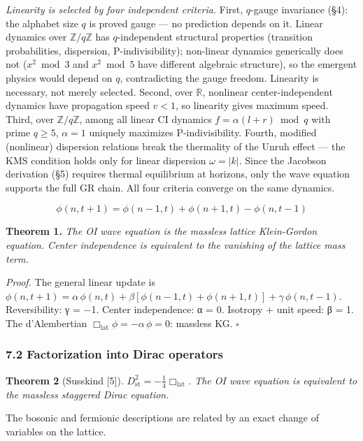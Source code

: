 \documentclass[
  11pt,
]{article}
\begin{document}
\emph{Linearity is selected by four independent criteria.} First,
\(q\)-gauge invariance (§4): the alphabet size \(q\) is proved gauge ---
no prediction depends on it. Linear dynamics over
\(\mathbb{Z}/q\mathbb{Z}\) has \(q\)-independent structural properties
(transition probabilities, dispersion, P-indivisibility); non-linear
dynamics generically does not (\(x^2 \bmod 3\) and \(x^2 \bmod 5\) have
different algebraic structure), so the emergent physics would depend on
\(q\), contradicting the gauge freedom. Linearity is necessary, not
merely selected. Second, over \(\mathbb{R}\), nonlinear
center-independent dynamics have propagation speed \(v < 1\), so
linearity gives maximum speed. Third, over \(\mathbb{Z}/q\mathbb{Z}\),
among all linear CI dynamics \(f = \alpha(l + r) \bmod q\) with prime
\(q \geq 5\), \(\alpha = 1\) uniquely maximizes P-indivisibility.
Fourth, modified (nonlinear) dispersion relations break the thermality
of the Unruh effect --- the KMS condition holds only for linear
dispersion \(\omega = |k|\). Since the Jacobson derivation (§5) requires
thermal equilibrium at horizons, only the wave equation supports the
full GR chain. All four criteria converge on the same dynamics.

\[\phi(n, t+1) = \phi(n-1, t) + \phi(n+1, t) - \phi(n, t-1)\]

\textbf{Theorem 1.} \emph{The OI wave equation is the massless lattice
Klein-Gordon equation. Center independence is equivalent to the
vanishing of the lattice mass term.}

\emph{Proof.} The general linear update is
\(\phi(n, t+1) = \alpha\,\phi(n,t) + \beta[\phi(n-1,t) + \phi(n+1,t)] + \gamma\,\phi(n,t-1)\).
Reversibility: γ = −1. Center independence: α = 0. Isotropy + unit
speed: β = 1. The d'Alembertian
\(\Box_{\text{lat}}\phi = -\alpha\,\phi = 0\): massless KG. \(\square\)

\hypertarget{factorization-into-dirac-operators}{%
\subsubsection{7.2 Factorization into Dirac
operators}\label{factorization-into-dirac-operators}}

\textbf{Theorem 2} (Susskind {[}5{]}).
\emph{\(D_{\text{st}}^2 = -\frac{1}{4}\Box_{\text{lat}}\). The OI wave
equation is equivalent to the massless staggered Dirac equation.}

The bosonic and fermionic descriptions are related by an exact change of
variables on the lattice.
\end{document}
